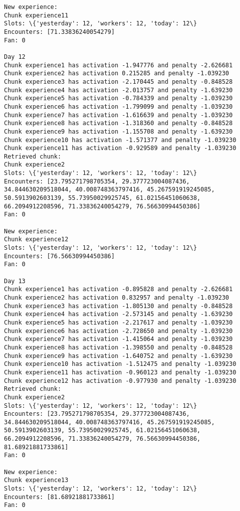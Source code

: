 \documentclass[11pt]{article}
\begin{document}
\begin{Verbatim}[commandchars=\\\{\}]
New experience:
Chunk experience11
Slots: \{'yesterday': 12, 'workers': 12, 'today': 12\}
Encounters: [71.33836240054279]
Fan: 0

Day 12
Chunk experience1 has activation -1.947776 and penalty -2.626681
Chunk experience2 has activation 0.215285 and penalty -1.039230
Chunk experience3 has activation -2.170445 and penalty -0.848528
Chunk experience4 has activation -2.013757 and penalty -1.639230
Chunk experience5 has activation -0.784339 and penalty -1.039230
Chunk experience6 has activation -1.799099 and penalty -1.039230
Chunk experience7 has activation -1.616639 and penalty -1.039230
Chunk experience8 has activation -1.318360 and penalty -0.848528
Chunk experience9 has activation -1.155708 and penalty -1.639230
Chunk experience10 has activation -1.571377 and penalty -1.039230
Chunk experience11 has activation -0.929589 and penalty -1.039230
Retrieved chunk:
Chunk experience2
Slots: \{'yesterday': 12, 'workers': 12, 'today': 12\}
Encounters: [23.795271798705354, 29.377723004087436, 34.844630209518044, 40.008748363797416, 45.267591919245085, 50.5913902603139, 55.73950029925745, 61.02156451060638, 66.2094912208596, 71.33836240054279, 76.56630994450386]
Fan: 0

New experience:
Chunk experience12
Slots: \{'yesterday': 12, 'workers': 12, 'today': 12\}
Encounters: [76.56630994450386]
Fan: 0

Day 13
Chunk experience1 has activation -0.895828 and penalty -2.626681
Chunk experience2 has activation 0.832957 and penalty -1.039230
Chunk experience3 has activation -1.805130 and penalty -0.848528
Chunk experience4 has activation -2.573145 and penalty -1.639230
Chunk experience5 has activation -2.217617 and penalty -1.039230
Chunk experience6 has activation -2.728650 and penalty -1.039230
Chunk experience7 has activation -1.415064 and penalty -1.039230
Chunk experience8 has activation -1.398550 and penalty -0.848528
Chunk experience9 has activation -1.640752 and penalty -1.639230
Chunk experience10 has activation -1.512475 and penalty -1.039230
Chunk experience11 has activation -0.960123 and penalty -1.039230
Chunk experience12 has activation -0.977930 and penalty -1.039230
Retrieved chunk:
Chunk experience2
Slots: \{'yesterday': 12, 'workers': 12, 'today': 12\}
Encounters: [23.795271798705354, 29.377723004087436, 34.844630209518044, 40.008748363797416, 45.267591919245085, 50.5913902603139, 55.73950029925745, 61.02156451060638, 66.2094912208596, 71.33836240054279, 76.56630994450386, 81.68921881733861]
Fan: 0

New experience:
Chunk experience13
Slots: \{'yesterday': 12, 'workers': 12, 'today': 12\}
Encounters: [81.68921881733861]
Fan: 0


\end{Verbatim}
\end{document}
